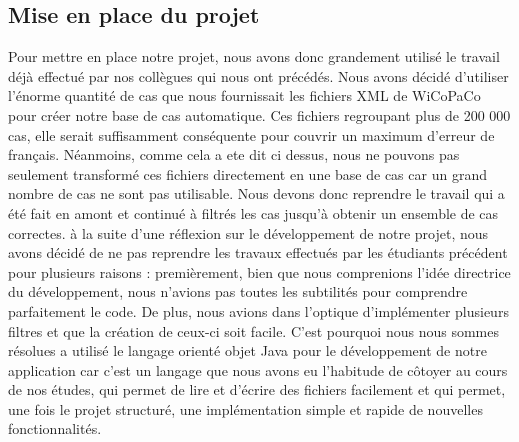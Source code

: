 \documentclass{article}
\begin{document}
\vspace*{35mm}


\subsection{Mise en place du projet}
Pour mettre en place notre projet, nous avons donc grandement utilis\'{e} le travail d\'{e}j\`{a} effectu\'{e} par nos coll\`{e}gues qui nous ont pr\'{e}c\'{e}d\'{e}s. Nous avons d\'{e}cid\'{e} d'utiliser l'\'{e}norme quantit\'{e} de cas que nous fournissait les fichiers XML de WiCoPaCo pour cr\'{e}er notre base de cas automatique. Ces fichiers regroupant plus de 200 000 cas, elle serait suffisamment cons\'{e}quente pour couvrir un maximum d'erreur de français. N\'{e}anmoins, comme cela a ete dit ci dessus, nous ne pouvons pas seulement transform\'{e} ces fichiers directement en une base de cas car un grand nombre de cas ne sont pas utilisable. Nous devons donc reprendre le travail qui a \'{e}t\'{e} fait en amont et continu\'{e} \`{a} filtr\'{e}s les cas jusqu'\`{a} obtenir un ensemble de cas correctes.
\newline
\newline
	\`{a} la suite d'une r\'{e}flexion sur le d\'{e}veloppement de notre projet, nous avons d\'{e}cid\'{e} de ne pas reprendre les travaux effectu\'{e}s par les \'{e}tudiants pr\'{e}c\'{e}dent pour plusieurs raisons : premi\`{e}rement, bien que nous comprenions l'id\'{e}e directrice du d\'{e}veloppement, nous n'avions pas toutes les subtilit\'{e}s pour comprendre parfaitement le code. De plus, nous avions dans l'optique d'impl\'{e}menter plusieurs filtres et que la cr\'{e}ation de ceux-ci soit facile. C'est pourquoi nous nous sommes r\'{e}solues a utilis\'{e} le langage orient\'{e} objet Java pour le d\'{e}veloppement de notre application car c'est un langage que nous avons eu l'habitude de côtoyer au cours de nos \'{e}tudes, qui permet de lire et d'\'{e}crire des fichiers facilement et qui permet, une fois le projet structur\'{e}, une impl\'{e}mentation simple et rapide de nouvelles fonctionnalit\'{e}s.
\end{document}
